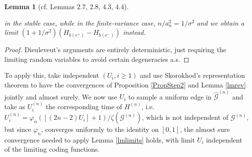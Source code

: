 \documentclass[11pt,a4paper]{article}
\newtheorem{lm}[prop]{Lemma}
\newcommand{\cG}{\mathcal{G}}
\begin{document}
\begin{lm}[cf. \cite{Die13} Lemmas 2.7, 2.8, 4.3, 4.4]
\begin{itemize}
      in the stable case, while in the finite-variance case, $n/a_n^2=1/\sigma^2$ and we obtain a limit $(1+1/\sigma^2)(H_{b(e^+)}-H_{b(e^-)})$ instead.
  \end{itemize}
\end{lm}
\begin{proof} Dieuleveut's arguments are entirely deterministic, just requiring the limiting random variables to avoid certain degeneracies a.s.
\end{proof}
To apply this, take independent $(U_i,i\ge 1)$ and use Skorokhod's representation theorem to have the convergences of Proposition \ref{PropStep2} and Lemma \ref{lmrev} 
jointly and almost surely. We now use $U_i$ to sample a uniform edge in $\widehat{\cG}^{(n)}$ and take as $U^{(n)}_i$ the corresponding time of
$H^{(n)}$, i.e. $U^{(n)}_i=\varphi_n([(2n-2)U_i]+1)/\zeta(\cG^{(n)})$, which is not independent of $\cG^{(n)}$, but since $\varphi_n$, 
converges uniformly to the identity on
$[0,1]$, the almost sure convergence needed to apply Lemma \ref{lmlimits} holds, with limit $U_i$ independent of the limiting coding functions.
\end{document}
